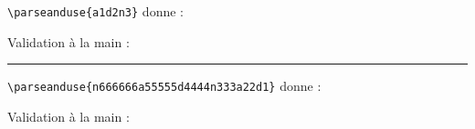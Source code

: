 \documentclass{article}
\begin{document}
\verb+\parseanduse{a1d2n3}+ donne : \newline


Validation à la main : \newline



\rule{\textwidth}{1pt}

\bigskip


\verb+\parseanduse{n666666a55555d4444n333a22d1}+ donne : \newline


Validation à la main : \newline

\end{document}
